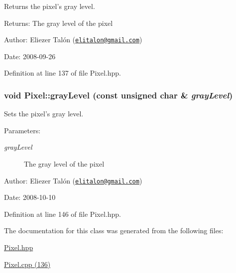 Returns the pixel's gray level. 

\begin{Desc}
\item[Returns:]The gray level of the pixel\end{Desc}
\begin{Desc}
\item[Author:]Eliezer Talón (\href{mailto:elitalon@gmail.com}{\tt elitalon@gmail.com}) \end{Desc}
\begin{Desc}
\item[Date:]2008-09-26 \end{Desc}


Definition at line 137 of file Pixel.hpp.\hypertarget{class_pixel_d00a337e0d9765daafe3017f2d819df8}{
\subsubsection[grayLevel]{\setlength{\rightskip}{0pt plus 5cm}void Pixel::grayLevel (const unsigned char \& {\em grayLevel})}}
\label{class_pixel_d00a337e0d9765daafe3017f2d819df8}


Sets the pixel's gray level. 

\begin{Desc}
\item[Parameters:]
\begin{description}
\item[{\em grayLevel}]The gray level of the pixel\end{description}
\end{Desc}
\begin{Desc}
\item[Author:]Eliezer Talón (\href{mailto:elitalon@gmail.com}{\tt elitalon@gmail.com}) \end{Desc}
\begin{Desc}
\item[Date:]2008-10-10 \end{Desc}


Definition at line 146 of file Pixel.hpp.

The documentation for this class was generated from the following files:\begin{CompactItemize}
\item 
\hyperlink{_pixel_8hpp}{Pixel.hpp}\item 
\hyperlink{_pixel_8cpp}{Pixel.cpp (136)}\end{CompactItemize}
